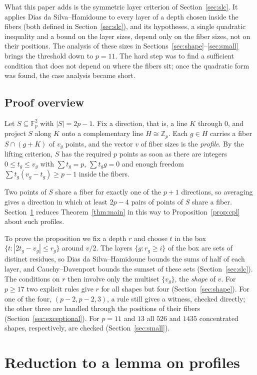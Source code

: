 \documentclass[11pt]{article}
\theoremstyle{remark}
\newcommand{\Z}{\mathbb{Z}}
\begin{document}
What this paper adds is the symmetric layer criterion of Section~\ref{sec:slc}. It applies Dias da Silva--Hamidoune to every layer of a depth chosen inside the fibers (both defined in Section~\ref{sec:slc}), and its hypotheses, a single quadratic inequality and a bound on the layer sizes, depend only on the fiber sizes, not on their positions. The analysis of these sizes in Sections~\ref{sec:shape}--\ref{sec:small} brings the threshold down to $p=11$. The hard step was to find a sufficient condition that does not depend on where the fibers sit; once the quadratic form was found, the case analysis became short.

\subsection{Proof overview}

Let $S\subseteq\mathbb F_p^2$ with $|S|=2p-1$. Fix a direction, that is, a line $K$ through $0$, and project $S$ along $K$ onto a complementary line $H\cong\Z_p$. Each $g\in H$ carries a fiber $S\cap(g+K)$ of $v_g$ points, and the vector $v$ of fiber sizes is the \emph{profile}. By the lifting criterion, $S$ has the required $p$ points as soon as there are integers $0\le t_g\le v_g$ with $\sum t_g=p$, $\sum t_g g=0$ and enough freedom $\sum t_g(v_g-t_g)\ge p-1$ inside the fibers.

Two points of $S$ share a fiber for exactly one of the $p+1$ directions, so averaging gives a direction in which at least $2p-4$ pairs of points of $S$ share a fiber. Section~\ref{sec:reduction} reduces Theorem~\ref{thm:main} in this way to Proposition~\ref{prop:cpl} about such profiles.

To prove the proposition we fix a depth $r$ and choose $t$ in the box $\{t:|2t_g-v_g|\le r_g\}$ around $v/2$. The layers $\{g:r_g\ge i\}$ of the box are sets of distinct residues, so Dias da Silva--Hamidoune bounds the sums of half of each layer, and Cauchy--Davenport bounds the sumset of these sets (Section~\ref{sec:slc}). The conditions on $r$ then involve only the multiset $\{v_g\}$, the \emph{shape} of $v$. For $p\ge17$ two explicit rules give $r$ for all shapes but four (Section~\ref{sec:shape}). For one of the four, $(p-2,p-2,3)$, a rule still gives a witness, checked directly; the other three are handled through the positions of their fibers (Section~\ref{sec:exceptional}). For $p=11$ and $13$ all $526$ and $1435$ concentrated shapes, respectively, are checked (Section~\ref{sec:small}).

\section{Reduction to a lemma on profiles}\label{sec:reduction}
\end{document}
